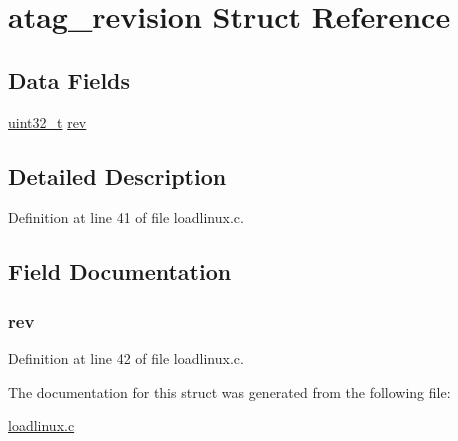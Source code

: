 \hypertarget{structatag__revision}{\section{atag\-\_\-revision \-Struct \-Reference}
\label{structatag__revision}
}
\subsection*{\-Data \-Fields}
\begin{DoxyCompactItemize}
\item 
\hyperlink{arch__types_8h_a435d1572bf3f880d55459d9805097f62}{uint32\-\_\-t} \hyperlink{structatag__revision_a9785d281d0ca6a77360f05a7d653a80f}{rev}
\end{DoxyCompactItemize}


\subsection{\-Detailed \-Description}


\-Definition at line 41 of file loadlinux.\-c.



\subsection{\-Field \-Documentation}
\hypertarget{structatag__revision_a9785d281d0ca6a77360f05a7d653a80f}{
\subsubsection[{rev}]{ {\bf rev}}}\label{structatag__revision_a9785d281d0ca6a77360f05a7d653a80f}


\-Definition at line 42 of file loadlinux.\-c.



\-The documentation for this struct was generated from the following file\-:\begin{DoxyCompactItemize}
\item 
\hyperlink{loadlinux_8c}{loadlinux.\-c}\end{DoxyCompactItemize}
